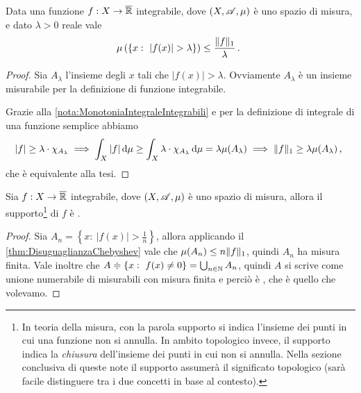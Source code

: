\begin{theorem}\label{thm:DisuguaglianzaChebyshev}
	Data una funzione $f:X\to\overline{\mathbb R}$ integrabile, dove $(X,\mathscr A,\mu)$ è uno spazio di misura, e dato $\lambda>0$ reale vale
	\begin{equation*}
		\mu\left(\left\{x:\ |f(x)|>\lambda\right\}\right) \le \frac{\LNorm f}{\lambda}\punto
	\end{equation*}
\end{theorem}
\begin{proof}
	Sia $A_\lambda$ l'insieme degli $x$ tali che $|f(x)|>\lambda$. Ovviamente $A_\lambda$ è un insieme misurabile per la definizione di funzione integrabile.
	
	Grazie alla \cref{nota:MonotoniaIntegraleIntegrabili} e per la definizione di integrale di una funzione semplice abbiamo
	\begin{equation*}
		|f|\ge\lambda \cdot \chi_{A_\lambda} \implies \int_X |f|\,\mathrm d\mu \ge \int_X \lambda\cdot\chi_{A_\lambda}\,\mathrm d\mu=\lambda\mu(A_\lambda)\implies
		\Vert f\Vert_1\ge \lambda\mu(A_\lambda)\, \text{, }
	\end{equation*}
	che è equivalente alla tesi.
\end{proof}

\begin{corollary}\label{cor:SupportoIntegrabile}
	Sia $f:X\to\overline{\mathbb R}$ integrabile, dove $(X,\mathscr A,\mu)$ è uno spazio di misura, 
	allora il supporto\footnote{In teoria della misura, con la parola supporto si indica l'insieme dei punti in cui una funzione non si annulla. 
	In ambito topologico invece, il supporto indica la \emph{chiusura} dell'insieme dei punti in cui non si annulla. 
	Nella sezione conclusiva di queste note il supporto assumerà il significato topologico (sarà facile distinguere tra i due concetti in base al contesto).}
	di $f$ è \sigfin[o].
\end{corollary}
\begin{proof}
	Sia $A_n=\left\{x:\ |f(x)|>\frac 1n \right\}$, allora applicando il \cref{thm:DisuguaglianzaChebyshev} vale che $\mu(A_n)\le n \Vert f\Vert_1$, quindi $A_n$ ha misura finita. Vale inoltre che $A\doteqdot\left\{x:\ f(x)\not=0 \right\}=\bigcup_{n\in\mathbb N}A_n$, quindi $A$ si scrive come unione numerabile di misurabili con misura finita e perciò è \sigfin[o], che è quello che volevamo.
\end{proof}


